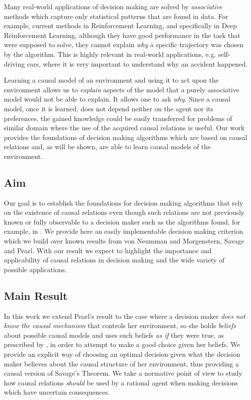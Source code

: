 \documentclass[review]{elsarticle}
\begin{document}
Many real-world applications of decision making are solved by \textit{associative} methods which capture only statistical patterns that are found in data. For example, current methods in Reinforcement Learning, and specifically in Deep Reinforcement Learning, although they have good performance in the task that were supposed to solve, they cannot explain \textit{why} a specific trajectory was chosen by the algorithm. This is highly relevant in real-world applications, e.g. self-driving cars, where it is very important to understand why an accident happened. 
	
Learning a causal model of an environment and using it to act upon the environment allows us to \textit{explain} aspects of the model that a purely associative model would not be able to explain. It allows one to ask \textit{why}. Since a causal model, once it is learned, does not depend neither on the agent nor its preferences, the gained knowledge could be easily transferred for problems of similar domain where the use of the acquired causal relations is useful.  Our work provides the foundations of decision making algorithms which are based on causal relations and, as will be shown, are able to learn causal models of the environment.

\subsection{Aim}
Our goal is to establish the foundations for decision making algorithms that rely on the existence of causal relations even though such relations are not previously known or fully observable to a decision maker such as the algorithms found, for example, in \citep{bareinboim2015bandits,lattimoreNIPS2016,sen2017identifying, gonzalez2018playing}. We provide here an easily implementable decision making criterion which we build over known results from von Neumman and Morgenstern, Savage and Pearl. With our result we expect to highlight the importance and applicability of causal relations in decision making and the wide variety of possible applications.

\subsection{Main Result}
In this work we extend Pearl's result to the case where a decision maker \textit{does not know the causal mechanism} that controls her environment, so she holds \textit{beliefs} about possible causal models and uses such beliefs \textit{as if} they were true, as prescribed by \cite{joyce1999foundations}, in order to attempt to make a good choice given her beliefs. We provide an explicit way of choosing an optimal decision given what the decision maker believes about the causal structure of her environment, thus providing a causal version of Savage's Theorem. We take a normative point of view to study how causal relations \textit{should} be used by a rational agent when making decisions which have uncertain consequences. 
\end{document}
